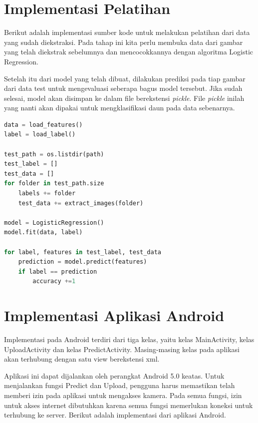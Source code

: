 \section{Implementasi Pelatihan}
\par Berikut adalah implementasi sumber kode untuk melakukan pelatihan dari data yang sudah diekstraksi. Pada tahap ini kita perlu membuka data dari gambar yang telah diekstrak sebelumnya dan mencocokkannya dengan algoritma Logistic Regression. 
\par Setelah itu dari model yang telah dibuat, dilakukan prediksi pada tiap gambar dari data test untuk mengevaluasi seberapa bagus model tersebut. Jika sudah selesai, model akan disimpan ke dalam file berekstensi \textit{pickle}. File \textit{pickle} inilah yang nanti akan dipakai untuk mengklasifikasi daun pada data sebenarnya.
\begin{lstlisting}[language=python, caption=Pseudocode implementasi ekstraksi fitur, label=code:read_h5, firstnumber=1]
data = load_features()
label = load_label()

test_path = os.listdir(path)
test_label = []
test_data = []
for folder in test_path.size
	labels += folder
	test_data += extract_images(folder)
	
model = LogisticRegression()
model.fit(data, label)

for label, features in test_label, test_data
	prediction = model.predict(features)
	if label == prediction
		accuracy +=1

\end{lstlisting}

\section{Implementasi Aplikasi Android}
\par Implementasi pada Android terdiri dari tiga kelas, yaitu kelas MainActivity, kelas UploadActivity dan kelas PredictActivity. Masing-masing kelas pada aplikasi akan terhubung dengan satu view berekstensi xml.

\par Aplikasi ini dapat dijalankan oleh perangkat Android 5.0 keatas. Untuk menjalankan fungsi Predict dan Upload, pengguna harus memastikan telah memberi izin pada aplikasi untuk mengakses kamera. Pada semua fungsi, izin untuk akses internet dibutuhkan karena semua fungsi memerlukan koneksi untuk terhubung ke server.
Berikut adalah implementasi dari aplikasi Android. 
